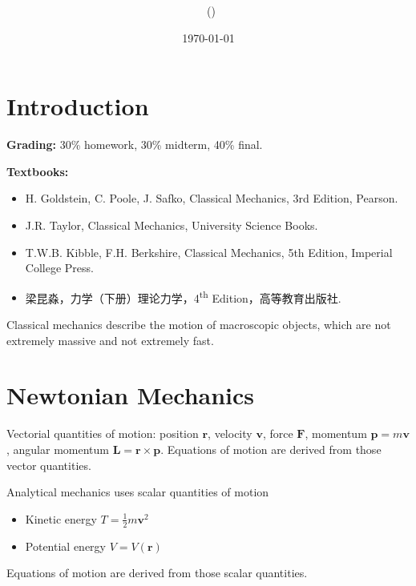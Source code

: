 \documentclass[twoside,9pt]{article}
\title{{\lms \Code \ \Ass}}
\author{\lms \name \ (\href{mailto:\mail}{\mail})}
\date{\lms \today}
\makeatletter
\numberwithin{equation}{section} %
\newcommand{\lms}{\fontfamily{lmss}\selectfont} %
\theoremstyle{definition}
\theoremstyle{remark}
\newtheorem*{remark}{\lms Remark}
\renewcommand{\maketitle}{\bgroup\setlength{\parindent}{0pt}
\begin{flushleft}
  \textbf{\Large\@title}

  \@author
\end{flushleft}\egroup
}
\makeatother
\begin{document}
\maketitle
\thispagestyle{title}


\tableofcontents
\newpage

\setcounter{section}{-1}
\section{Introduction}
\textbf{Grading:} 30\% homework, 30\% midterm, 40\% final.

\textbf{Textbooks:}
\begin{itemize}
    \item H. Goldstein, C. Poole, J. Safko, Classical Mechanics,
    3rd Edition, Pearson.
    \item J.R. Taylor, Classical Mechanics, University Science Books.
    \item T.W.B. Kibble, F.H. Berkshire, Classical Mechanics, 5th Edition,
    Imperial College Press.
    \item 梁昆淼，力学（下册）理论力学，4\textsuperscript{th} Edition，高等教育出版社.
\end{itemize}

Classical mechanics describe the motion of macroscopic objects, which are
not extremely massive and not extremely fast.

\section{Newtonian Mechanics}
Vectorial quantities of motion: position $\mathbf{r}$, 
velocity $\mathbf{v}$, force $\mathbf{F}$,
momentum $\mathbf{p}=m\mathbf{v}$,
angular momentum $\mathbf{L}=\mathbf{r}\times\mathbf{p}$.
Equations of motion are derived from those vector quantities.

Analytical mechanics uses scalar quantities of motion
\begin{itemize}
    \item Kinetic energy $T = \frac{1}{2}m\mathbf{v}^2$
    \item Potential energy $V = V(\mathbf{r})$
\end{itemize}
Equations of motion are derived from those scalar quantities.
\end{document}
